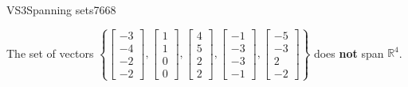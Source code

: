 \begin{exercise}{VS3}{Spanning sets}{7668}
\begin{exerciseAnswer}
 

 The set of vectors \(\left\{ \left[\begin{array}{c}
-3 \\
-4 \\
-2 \\
-2
\end{array}\right] , \left[\begin{array}{c}
1 \\
1 \\
0 \\
0
\end{array}\right] , \left[\begin{array}{c}
4 \\
5 \\
2 \\
2
\end{array}\right] , \left[\begin{array}{c}
-1 \\
-3 \\
-3 \\
-1
\end{array}\right] , \left[\begin{array}{c}
-5 \\
-3 \\
2 \\
-2
\end{array}\right] \right\}\) does \textbf{not} span \(\mathbb{R}^4\). 

 \end{exerciseAnswer}
 \end{exercise}


